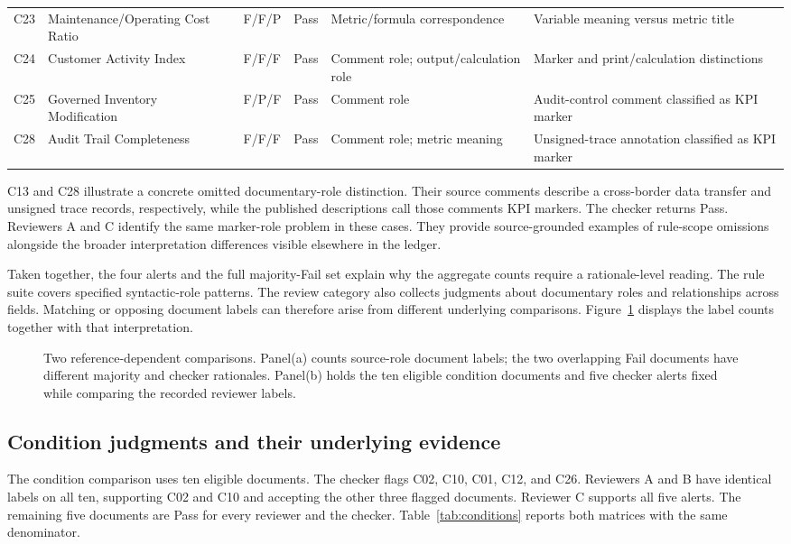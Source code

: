 \documentclass[a4paper,fleqn]{cas-dc}
\begin{document}
\begin{table}[t]
\begin{tabularx}{\textwidth}{@{}lp{}llYY@{}}
C23 & Maintenance/Operating Cost Ratio & F/F/P & Pass & Metric/formula correspondence & Variable meaning versus metric title \\
C24 & Customer Activity Index & F/F/F & Pass & Comment role; output/calculation role & Marker and print/calculation distinctions \\
C25 & Governed Inventory Modification & F/P/F & Pass & Comment role & Audit-control comment classified as KPI marker \\
C28 & Audit Trail Completeness & F/F/F & Pass & Comment role; metric meaning & Unsigned-trace annotation classified as KPI marker \\
\bottomrule
\end{tabularx}
\end{table}

C13 and C28 illustrate a concrete omitted documentary-role distinction. Their source comments describe a cross-border data transfer and unsigned trace records, respectively, while the published descriptions call those comments KPI markers. The checker returns Pass. Reviewers A and C identify the same marker-role problem in these cases. They provide source-grounded examples of rule-scope omissions alongside the broader interpretation differences visible elsewhere in the ledger.

Taken together, the four alerts and the full majority-Fail set explain why the aggregate counts require a rationale-level reading. The rule suite covers specified syntactic-role patterns. The review category also collects judgments about documentary roles and relationships across fields. Matching or opposing document labels can therefore arise from different underlying comparisons. Figure~\ref{fig:comparison} displays the label counts together with that interpretation.

\begin{figure}[t]
\centering

\caption{Two reference-dependent comparisons. Panel(a) counts source-role document labels; the two overlapping Fail documents have different majority and checker rationales. Panel(b) holds the ten eligible condition documents and five checker alerts fixed while comparing the recorded reviewer labels.}
\label{fig:comparison}
\end{figure}

\subsection{Condition judgments and their underlying evidence}
The condition comparison uses ten eligible documents. The checker flags C02, C10, C01, C12, and C26. Reviewers A and B have identical labels on all ten, supporting C02 and C10 and accepting the other three flagged documents. Reviewer C supports all five alerts. The remaining five documents are Pass for every reviewer and the checker. Table~\ref{tab:conditions} reports both matrices with the same denominator.
\end{document}
